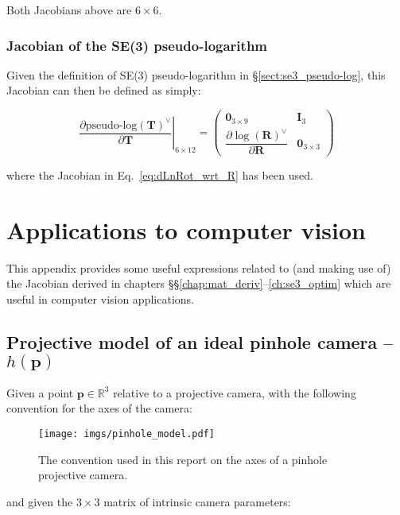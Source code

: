 \documentclass[a4paper,11pt]{report}
\begin{document}
Both Jacobians above are $6 \times 6$.


\subsection{Jacobian of the SE(3) pseudo-logarithm}
\label{sect:eq:jacob_dLnSE3_dSE3}

Given the definition of SE(3) pseudo-logarithm
in \S\ref{sect:se3_pseudo-log}, 
this Jacobian can then be defined as simply:

\begin{equation}
\label{eq:dLnSE3_wrt_SE3}
\left.
 \frac{\partial \text{pseudo-log}(\mathbf{T})^\vee }{\partial \mathbf{T}}
\right|_{6 \times 12}
=
\left(
\begin{array}{cc}
 \mathbf{0}_{3 \times 9} & \mathbf{I}_3 \\
 \dfrac{\partial \log(\mathbf{R})^\vee }{\partial \mathbf{R}} & \mathbf{0}_{3 \times 3}
\end{array}
\right)
\end{equation}

\noindent where the Jacobian in Eq.~\ref{eq:dLnRot_wrt_R} has been used.


\appendix

\chapter{Applications to computer vision}
\label{ch:apx:cv}

This appendix provides some useful expressions related to (and making use of)
the Jacobian derived in chapters \S\S\ref{chap:mat_deriv}--\ref{ch:se3_optim}
which are useful
in computer vision applications.


\section{Projective model of an ideal pinhole camera -- $h(\mathbf{p})$}

Given a point $\mathbf{p} \in \mathbb{R}^3$ relative to a
projective camera, with the following convention for the axes of the
camera:

\begin{figure}[h!]
\centering
\texttt{[image: imgs/pinhole\_model.pdf]}
\caption{The convention used in this report on the axes of a pinhole projective camera.}
\label{fig:pinhole}
\end{figure}

\noindent and given the $3 \times 3$ matrix of intrinsic camera parameters:
\end{document}
